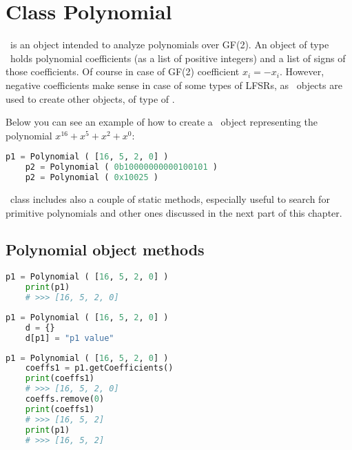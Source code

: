 \chapter{Class Polynomial}

\Polynomial\ is an object intended to analyze polynomials over GF(2). An object of type \Polynomial\ holds polynomial coefficients (as a list of positive integers) and a list of signs of those coefficients. Of course in case of GF(2) coefficient $x_i = -x_i$. However, negative coefficients make sense in case of some types of LFSRs, as \Polynomial\ objects are used to create other objects, of type of \Lfsr.

Below you can see an example of how to create a \Polynomial\ object representing the polynomial $x^{16} + x^5 + x^2 + x^0$:
\begin{lstlisting}[language=Python]
	p1 = Polynomial ( [16, 5, 2, 0] )
	p2 = Polynomial ( 0b10000000000100101 )
	p2 = Polynomial ( 0x10025 )
\end{lstlisting}

\Polynomial\ class includes also a couple of static methods, especially useful to search for primitive polynomials and other ones discussed in the next part of this chapter.

\section{Polynomial object methods}

\begin{lstlisting}[language=Python]
	p1 = Polynomial ( [16, 5, 2, 0] )
	print(p1)
	# >>> [16, 5, 2, 0]
\end{lstlisting}

\begin{lstlisting}[language=Python]
	p1 = Polynomial ( [16, 5, 2, 0] )
	d = {}
	d[p1] = "p1 value"
\end{lstlisting}

\begin{lstlisting}[language=Python]
	p1 = Polynomial ( [16, 5, 2, 0] )
	coeffs1 = p1.getCoefficients()
	print(coeffs1)
	# >>> [16, 5, 2, 0]
	coeffs.remove(0)
	print(coeffs1)
	# >>> [16, 5, 2]
	print(p1)
	# >>> [16, 5, 2]
\end{lstlisting}

